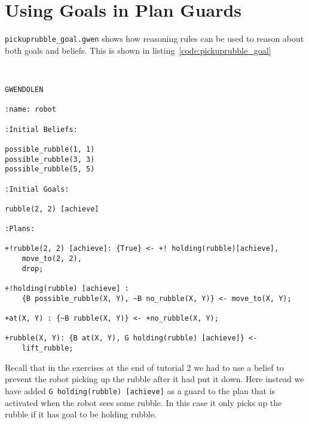 \section{Using Goals in Plan Guards}

\texttt{pickuprubble\_goal.gwen} shows how reasoning rules can be used to reason about both goals and beliefs.  This is shown in listing~\ref{code:pickuprubble_goal}
\begin{ourexample}
\label{code:pickuprubble_goal} \quad \\
\begin{lstlisting}[basicstyle=\sffamily,style=easslisting,language=Gwendolen]
GWENDOLEN

:name: robot

:Initial Beliefs:

possible_rubble(1, 1)
possible_rubble(3, 3)
possible_rubble(5, 5)

:Initial Goals:

rubble(2, 2) [achieve]

:Plans:

+!rubble(2, 2) [achieve]: {True} <- +! holding(rubble)[achieve],
    move_to(2, 2), 
    drop;

+!holding(rubble) [achieve] : 
    {B possible_rubble(X, Y), ~B no_rubble(X, Y)} <- move_to(X, Y);

+at(X, Y) : {~B rubble(X, Y)} <- +no_rubble(X, Y);

+rubble(X, Y): {B at(X, Y), G holding(rubble) [achieve]} <- 
    lift_rubble;
\end{lstlisting}
\end{ourexample}
Recall that in the exercises at the end of tutorial 2 we had to use a belief to prevent the robot picking up the rubble after it had put it down.  Here instead we have added \lstinline{G holding(rubble) [achieve]} as a guard to the plan that is activated when the robot sees some rubble.  In this case it only picks up the rubble if it has goal to be holding rubble.

